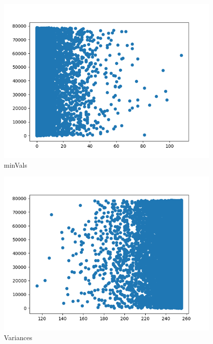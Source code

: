 \begin{figure}
	\includegraphics[width=\textwidth]{images/minVals}
	\caption{minVals}
	\label{minVals}
\end{figure}

\begin{figure}
	\includegraphics[width=\textwidth]{images/variances}
	\caption{Variances}
	\label{variances}
\end{figure}

